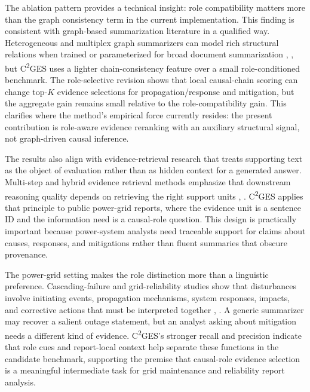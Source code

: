 \documentclass{ieeeaccess}
\begin{document}
The ablation pattern provides a technical insight: role compatibility matters more than the graph consistency term in the current implementation. This finding is consistent with graph-based summarization literature in a qualified way. Heterogeneous and multiplex graph summarizers can model rich structural relations when trained or parameterized for broad document summarization \cite{wang2020heterogeneous}, \cite{jing2021multiplex}, but C\textsuperscript{2}GES uses a lighter chain-consistency feature over a small role-conditioned benchmark. The role-selective revision shows that local causal-chain scoring can change top-\(K\) evidence selections for propagation/response and mitigation, but the aggregate gain remains small relative to the role-compatibility gain. This clarifies where the method's empirical force currently resides: the present contribution is role-aware evidence reranking with an auxiliary structural signal, not graph-driven causal inference.

The results also align with evidence-retrieval research that treats supporting text as the object of evaluation rather than as hidden context for a generated answer. Multi-step and hybrid evidence retrieval methods emphasize that downstream reasoning quality depends on retrieving the right support units \cite{liao2023muser}, \cite{liang2020hammer}. C\textsuperscript{2}GES applies that principle to public power-grid reports, where the evidence unit is a sentence ID and the information need is a causal-role question. This design is practically important because power-system analysts need traceable support for claims about causes, responses, and mitigations rather than fluent summaries that obscure provenance.

The power-grid setting makes the role distinction more than a linguistic preference. Cascading-failure and grid-reliability studies show that disturbances involve initiating events, propagation mechanisms, system responses, impacts, and corrective actions that must be interpreted together \cite{rajkumar2023cyber}, \cite{xie2022massively}. A generic summarizer may recover a salient outage statement, but an analyst asking about mitigation needs a different kind of evidence. C\textsuperscript{2}GES's stronger recall and precision indicate that role cues and report-local context help separate these functions in the candidate benchmark, supporting the premise that causal-role evidence selection is a meaningful intermediate task for grid maintenance and reliability report analysis.
\end{document}
